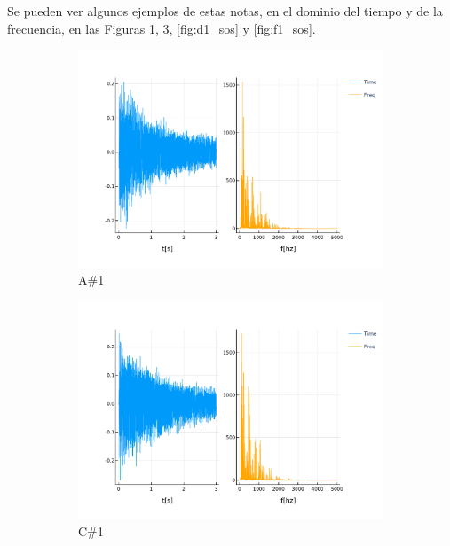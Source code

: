 \documentclass[12pt]{article}
\begin{document}
Se pueden ver algunos ejemplos de estas notas, en el dominio del tiempo y de la frecuencia, en las Figuras
\ref{fig:a1_sos}, \ref{fig:c1_sos}, \ref{fig:d1_sos} y \ref{fig:f1_sos}.

\newpage
\begin{figure}[!ht]
	\centering
	\begin{subfigure}{.5\textwidth}
		\centering
		\includegraphics[width=1.0\linewidth]{assets/A1_sos.pdf}
		\caption{A\#1}
		\label{fig:a1_sos}
	\end{subfigure}%
	\begin{subfigure}{.5\textwidth}
		\centering
		\includegraphics[width=1.0\linewidth]{assets/C1_sos.pdf}
		\caption{C\#1}
		\label{fig:c1_sos}
	\end{subfigure}
	\caption{}
\end{figure}
\end{document}
